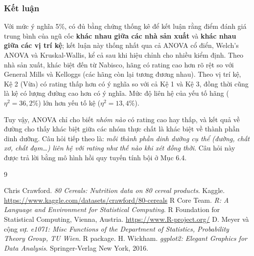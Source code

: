 \documentclass[12pt,a4paper]{article}
\begin{document}
\subsubsection{Kết luận}

Với mức ý nghĩa 5\%, có đủ bằng chứng thống kê để kết luận rằng điểm đánh giá trung bình của
ngũ cốc \textbf{khác nhau giữa các nhà sản xuất} và \textbf{khác nhau giữa các vị trí kệ}; kết
luận này thống nhất qua cả ANOVA cổ điển, Welch's ANOVA và Kruskal-Wallis, kể cả sau khi hiệu
chỉnh cho nhiều kiểm định. Theo nhà sản xuất, khác biệt đến từ Nabisco, hãng có rating cao hơn
rõ rệt so với General Mills và Kelloggs (các hãng còn lại tương đương nhau). Theo vị trí kệ,
Kệ 2 (Vừa) có rating thấp hơn có ý nghĩa so với cả Kệ 1 và Kệ 3, đồng thời cũng là kệ có lượng
đường cao hơn có ý nghĩa. Mức độ liên hệ của yếu tố hãng ($\eta^2 = 36{,}2\%$) lớn hơn yếu tố kệ
($\eta^2 = 13{,}4\%$).

Tuy vậy, ANOVA chỉ cho biết \emph{nhóm nào} có rating cao hay thấp, và kết quả về đường cho
thấy khác biệt giữa các nhóm thực chất là khác biệt về thành phần dinh dưỡng. Câu hỏi tiếp theo
là: \emph{mỗi thành phần dinh dưỡng cụ thể (đường, chất xơ, chất đạm\ldots) liên hệ với rating
như thế nào khi xét đồng thời}. Câu hỏi này được trả lời bằng mô hình hồi quy tuyến tính bội ở
Mục 6.4.

\begin{thebibliography}{9}
 Chris Crawford. \textit{80 Cereals: Nutrition data on 80 cereal products}.
Kaggle. \url{https://www.kaggle.com/datasets/crawford/80-cereals}
 R Core Team. \textit{R: A Language and Environment for Statistical Computing}.
R Foundation for Statistical Computing, Vienna, Austria. \url{https://www.R-project.org/}
 D. Meyer và cộng sự. \textit{e1071: Misc Functions of the Department of
Statistics, Probability Theory Group, TU Wien}. R package.
 H. Wickham. \textit{ggplot2: Elegant Graphics for Data Analysis}.
Springer-Verlag New York, 2016.
\end{thebibliography}
\end{document}
